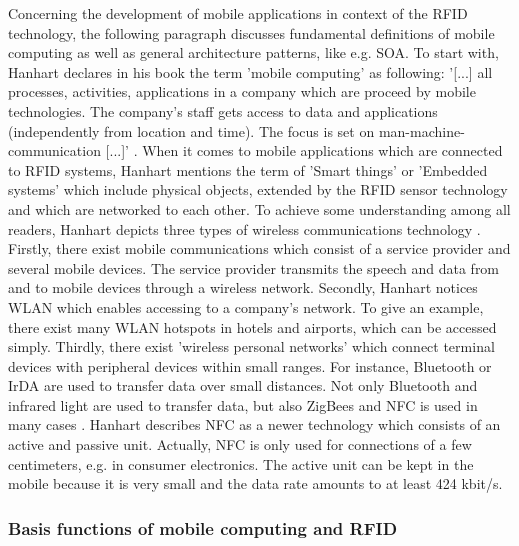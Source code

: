Concerning the development of mobile applications in context of the RFID technology, the following paragraph discusses fundamental definitions of mobile computing as well as general architecture patterns, like e.g. \ac{SOA}. 
To start with, Hanhart declares in his book \cite[p.9 ff.]{mobile} the term 'mobile computing' as following: '[...] all processes, activities, applications in a company which are proceed by mobile technologies. The company's staff gets access to data and applications (independently from location and time). The focus is set on man-machine-communication [...]' \cite[p.9 ff.]{mobile}. 
When it comes to mobile applications which are connected to RFID systems, Hanhart mentions the term of 'Smart things' or 'Embedded systems' which include physical objects, extended by the RFID sensor technology and which are networked to each other. To achieve some understanding among all readers, Hanhart depicts three types of wireless communications technology \cite[p.12-13]{mobile}. Firstly, there exist mobile communications which consist of a service provider and several mobile devices. The service provider transmits the speech and data from and to mobile devices through a wireless network. 
Secondly, Hanhart notices \ac{WLAN} which enables accessing to a company's network. To give an example, there exist many WLAN hotspots in hotels and airports, which can be accessed simply. Thirdly, there exist 'wireless personal networks' which connect terminal devices with peripheral devices within small ranges. For instance, Bluetooth or \ac{IrDA} are used to transfer data over small distances. Not only Bluetooth and infrared light are used to transfer data, but also ZigBees and \ac{NFC} is used in many cases \cite[p.12-13]{mobile}. Hanhart describes NFC as a newer technology which consists of an active and passive unit. Actually, NFC is only used for connections of a few centimeters, e.g. in consumer electronics. The active unit can be kept in the mobile because it is very small and the data rate amounts to at least 424 kbit/s.
 
\subsubsection{Basis functions of mobile computing and RFID}

